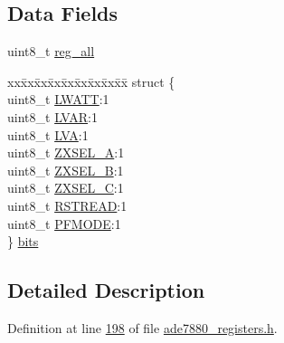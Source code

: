 \subsection*{Data Fields}
\begin{DoxyCompactItemize}
\item 
uint8\-\_\-t \hyperlink{a00026_ab2957613fa7f241407cc98e80676dccf}{reg\-\_\-all}
\item 
\begin{tabbing}
xx\=xx\=xx\=xx\=xx\=xx\=xx\=xx\=xx\=\kill
struct \{\\
\>uint8\_t \hyperlink{a00026_a70f9611c0de26d5286538fefacdbc496}{LWATT}:1\\
\>uint8\_t \hyperlink{a00026_a78593164042985c43c70910702645036}{LVAR}:1\\
\>uint8\_t \hyperlink{a00026_ab9fef0df339af123203f0a602bbaad41}{LVA}:1\\
\>uint8\_t \hyperlink{a00026_a068f0a364de8fa56faa732c081d0d063}{ZXSEL\_A}:1\\
\>uint8\_t \hyperlink{a00026_a2b7940d1ad2b70ed4644b6bac2288f2d}{ZXSEL\_B}:1\\
\>uint8\_t \hyperlink{a00026_a4104c2c769740a5468325bff44e8eb02}{ZXSEL\_C}:1\\
\>uint8\_t \hyperlink{a00026_aafaa346df324b01a075cd375da912a54}{RSTREAD}:1\\
\>uint8\_t \hyperlink{a00026_af9fed4395e32a1102c342a431884f799}{PFMODE}:1\\
\} \hyperlink{a00026_a753445562408b90f150f83de3717efba}{bits}\\

\end{tabbing}\end{DoxyCompactItemize}


\subsection{Detailed Description}


Definition at line \hyperlink{a00036_source_l00198}{198} of file \hyperlink{a00036_source}{ade7880\-\_\-registers.\-h}.



